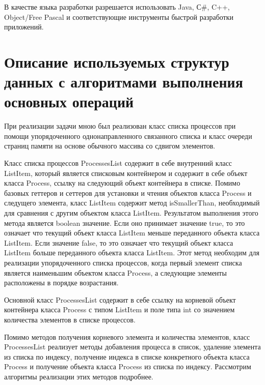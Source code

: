 \documentclass[russian,utf8,simple,hpadding=10mm,vpadding=20mm]{eskdtext}
\begin{document}
В качестве языка разработки разрешается использовать  Java, С#, C++, Object/Free Pascal и соответствующие инструменты быстрой разработки приложений.

\newpage
\parindent=15mm
\doublespacing
\section{Описание используемых структур данных с алгоритмами выполнения основных операций}

При реализации задачи мною был реализован класс списка процессов при помощи упорядоченного однонаправленного связанного списка и класс очереди страниц памяти на основе обычного массива со сдвигом элементов.

Класс списка процессов ProcessesList содержит в себе внутренний класс ListItem, который является списковым контейнером и содержит в себе объект класса Process, ссылку на следующий объект контейнера в списке. Помимо базовых геттеров и сеттеров для установки и чтения объектов класса Process и следущего элемента, класс ListItem содержит метод isSmallerThan, необходимый для сравнения с другим объектом класса ListItem. Результатом выполнения этого метода является boolean значение. Если оно принимает значение true, то это означает что текущий объект класса ListItem меньше переданного объекта класса ListItem. Если значение false, то это означает что текущий объект класса ListItem больше переданного объекта класса ListItem. Этот метод необходим для реализации упорядоченного списка процессов, когда первый элемент списка является наименьшим объектом класса Process, а следующие элементы расположены в порядке возрастания.

Основной класс ProcessesList содержит в себе ссылку на корневой объект контейнера класса Process с типом ListItem и поле типа int со значением количества элементов в списке процессов. 

Помимо методов получения корневого элемента и количества элементов, класс ProcessesList реализует методы добавления процесса в список, удаление элемента из списка по индексу, получение индекса в списке конкретного объекта класса Process и получение объекта класса Process из списка по индексу. Рассмотрим алгоритмы реализации этих методов подробнее.
\end{document}
